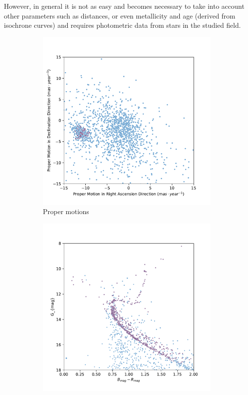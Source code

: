 \documentclass[11pt, a4paper, english]{book}
\begin{document}
However, in general it is not as easy and becomes necessary to take into account other parameters such as distances, or even
metallicity and age (derived from isochrone curves) and requires photometric data from stars in the studied field.

\begin{figure}[htbp]
  \centering
  \begin{subfigure}[t]{0.45\textwidth}
    \centering
    \includegraphics[width=\textwidth]{../figures/pm_ngc_2682.pdf}
    \caption{Proper motions}
    \label{fig:pm_ngc_2682}
  \end{subfigure}
  \hfill
  \begin{subfigure}[t]{0.45\textwidth}
    \centering
    \includegraphics[width=\textwidth]{../figures/isochrone_ngc_2682.pdf}

\end{subfigure}
\end{figure}
\end{document}
